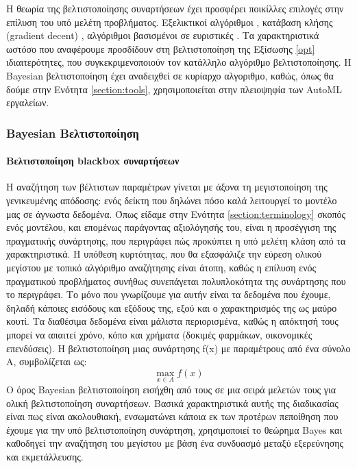 	Η θεωρία της βελτιστοποίησης συναρτήσεων έχει προσφέρει ποικίλλες επιλογές στην επίλυση του υπό μελέτη προβλήματος. Eξελικτικοί αλγόριθμοι \citep{1554741}, κατάβαση κλήσης (gradient decent) \citep{wassenberg},  αλγόριθμοι βασισμένοι σε ευριστικές \citep{Nelder01011965, Huang2006}. Τα χαρακτηριστικά ωστόσο που αναφέρουμε προσδίδουν στη βελτιστοποίηση της Εξίσωσης \ref{opt} ιδιαιτερότητες, που συγκεκριμενοποιούν τον κατάλληλο αλγόριθμο βελτιστοποίησης. Η Bayesian βελτιστοποίηση έχει αναδειχθεί σε κυρίαρχο αλγοριθμο, καθώς, όπως θα δούμε στην Ενότητα \ref{section:tools}, χρησιμοποιείται στην πλειοψηφία των \gls{AutoML} εργαλείων.
 \subsubsection{Bayesian Βελτιστοποίηση}
 	\paragraph{Βελτιστοποίηση blackbox συναρτήσεων} Η αναζήτηση των βέλτιστων παραμέτρων γίνεται με άξονα τη μεγιστοποίηση της γενικευμένης απόδοσης: ενός δείκτη που δηλώνει πόσο καλά λειτουργεί το μοντέλο μας σε άγνωστα δεδομένα. Όπως είδαμε στην Ενότητα \ref{section:terminology} σκοπός ενός μοντέλου, και επομένως παράγοντας αξιολόγησής του, είναι η προσέγγιση της πραγματικής συνάρτησης, που περιγράφει πώς προκύπτει η υπό μελέτη κλάση από τα χαρακτηριστικά. Η υπόθεση κυρτότητας, που θα εξασφάλιζε την εύρεση ολικού μεγίστου με τοπικό αλγόριθμο αναζήτησης είναι άτοπη, καθώς η επίλυση ενός πραγματικού προβλήματος συνήθως συνεπάγεται πολυπλοκότητα της συνάρτησης που το περιγράφει. Το μόνο που γνωρίζουμε για αυτήν είναι τα δεδομένα που έχουμε, δηλαδή κάποιες εισόδους και εξόδους της, εξού και ο χαρακτηρισμός της ως μαύρο κουτί. Τα διαθέσιμα δεδομένα είναι μάλιστα περιορισμένα, καθώς η απόκτησή τους μπορεί να απαιτεί χρόνο, κόπο και χρήματα (δοκιμές φαρμάκων, οικονομικές επενδύσεις). Η βελτιστοποίηση μιας συνάρτησης f(x) με παραμέτρους από ένα σύνολο A, συμβολίζεται ως:
 \begin{equation}
 \max_{x \in  A } f(x)
 \end{equation}
 	Ο όρος Bayesian βελτιστοποίηση εισήχθη από τους \citet{Mockus1991} σε μια σειρά μελετών τους για ολική βελτιστοποίηση συναρτήσεων. Βασικά χαρακτηριστικά αυτής της διαδικασίας είναι πως είναι ακολουθιακή, ενσωματώνει κάποια εκ των προτέρων πεποίθηση που έχουμε για την υπό βελτιστοποίηση συνάρτηση, χρησιμοποιεί το θεώρημα Bayes και καθοδηγεί την αναζήτηση του μεγίστου με βάση ένα συνδυασμό μεταξύ εξερεύνησης και εκμετάλλευσης.
